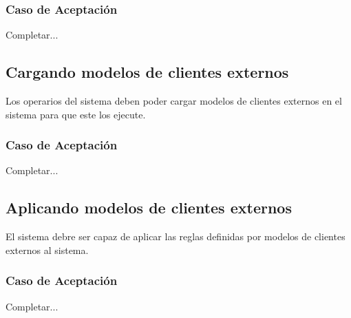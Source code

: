 \subsubsection*{Caso de Aceptación}
Completar...

\linea \subsection*{Cargando modelos de clientes externos}
Los operarios del sistema deben poder cargar modelos de clientes externos en el sistema para que este los ejecute.
\subsubsection*{Caso de Aceptación}
Completar...

\linea \subsection*{Aplicando modelos de clientes externos}
El sistema debre ser capaz de aplicar las reglas definidas por modelos de clientes externos al sistema.
\subsubsection*{Caso de Aceptación}
Completar...

